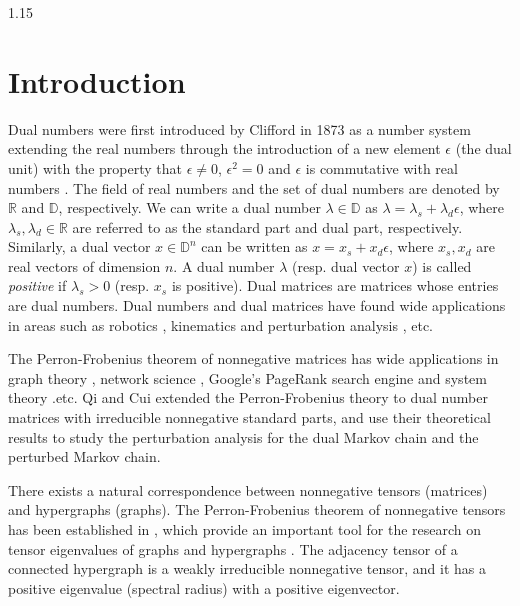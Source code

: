 \documentclass[preprint,12pt]{elsarticle}
\begin{document}
\begin{spacing}{1.15}
\section{Introduction}
Dual numbers were first introduced by Clifford in 1873 as a number system extending the real numbers through the introduction of a new element $\epsilon$ (the dual unit) with the property that $\epsilon\neq0$, ${\epsilon}^2=0$ and $\epsilon$ is commutative with real numbers \cite{clifford1871preliminary}. The field of real numbers and the set of dual numbers are denoted by $\mathbb{R}$ and $\mathbb{D}$, respectively. We can write a dual number $\lambda\in \mathbb{D}$ as $\lambda=\lambda_s+\lambda_d\epsilon$, where $\lambda_s,\lambda_d\in\mathbb{R}$ are referred to as the standard part and dual part, respectively. Similarly, a dual vector $x\in\mathbb{D}^n$ can be written as $x=x_s+x_d\epsilon$, where $x_s,x_d$ are real vectors of dimension $n$. A dual number $\lambda$ (resp. dual vector $x$) is called \textit{positive} if $\lambda_s>0$ (resp. $x_s$ is positive). Dual matrices are matrices whose entries are dual numbers. Dual numbers and dual matrices have found wide applications in areas such as robotics \cite{gu1987dual}, kinematics \cite{fischer2017dual,moreno2024automatic} and perturbation analysis \cite{jiang2024perturbation,qi2024eigenvalues}, etc.

The Perron-Frobenius theorem of nonnegative matrices \cite{meyer2023matrix} has wide applications in graph theory \cite{kirkland1996characteristic}, network science \cite{bihari2015eigenvector}, Google's PageRank search engine \cite{langville2005survey} and system theory \cite{aeyels2002extension} .etc. Qi and Cui \cite{qi2024dual} extended the Perron-Frobenius theory to dual number matrices with irreducible nonnegative standard parts, and use their theoretical results to study the perturbation analysis for the dual Markov chain and the perturbed Markov chain.

There exists a natural correspondence between nonnegative tensors (matrices) and hypergraphs (graphs).
The Perron-Frobenius theorem of nonnegative tensors has been established in \cite{chang2008perron,yang2010further,friedland2013perron}, which provide an important tool for the research on tensor eigenvalues of graphs and hypergraphs \cite{qi2017tensor,cooper2012spectra,xu2023two,liu2023generalization,chen2024spectra}.
The adjacency tensor of a connected hypergraph is a weakly irreducible nonnegative tensor, and it has a positive eigenvalue (spectral radius) with a positive eigenvector.


\end{spacing}
\end{document}
